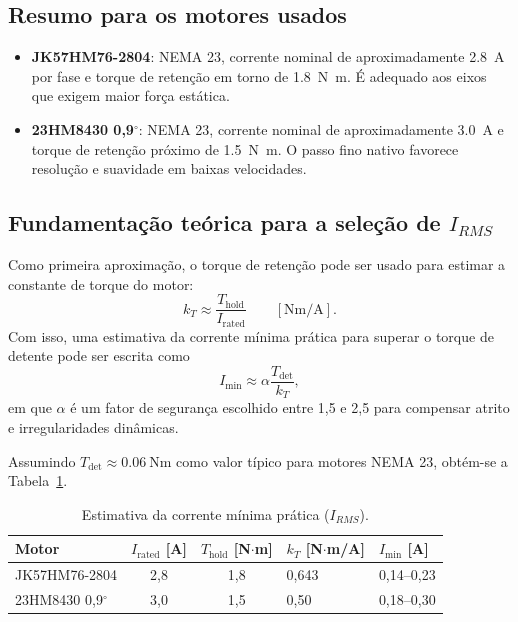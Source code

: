 \subsection{Resumo para os motores usados}

\begin{itemize}
\item \textbf{JK57HM76-2804}: NEMA 23, corrente nominal de
  aproximadamente \SI{2.8}{\ampere} por fase e torque de reten\c{c}\~ao em
  torno de \SI{1.8}{\newton\meter}. \'E adequado aos eixos que exigem
  maior for\c{c}a est\'atica.
\item \textbf{23HM8430 0,9$^\circ$}: NEMA 23, corrente nominal de
  aproximadamente \SI{3.0}{\ampere} e torque de reten\c{c}\~ao pr\'oximo de
  \SI{1.5}{\newton\meter}. O passo fino nativo favorece resolu\c{c}\~ao e
  suavidade em baixas velocidades.
\end{itemize}

\subsection{Fundamenta\c{c}\~ao te\'orica para a sele\c{c}\~ao de $I_{RMS}$}

Como primeira aproxima\c{c}\~ao, o torque de reten\c{c}\~ao pode ser usado
para estimar a constante de torque do motor:
\begin{equation}
    k_T \approx \frac{T_{\text{hold}}}{I_{\text{rated}}}
    \qquad [\si{\newton\meter\per\ampere}].
\end{equation}
Com isso, uma estimativa da corrente m\'inima pr\'atica para superar o
torque de detente pode ser escrita como
\begin{equation}
    I_{\min} \approx \alpha \frac{T_{\text{det}}}{k_T},
\end{equation}
em que $\alpha$ \'e um fator de seguran\c{c}a escolhido entre 1,5 e 2,5
para compensar atrito e irregularidades din\^amicas.

Assumindo $T_{\text{det}} \approx \SI{0.06}{\newton\meter}$ como valor
t\'ipico para motores NEMA 23, obt\'em-se a Tabela~\ref{tab:irms-estimado}.

\begin{table}[H]
    \centering
    \caption{Estimativa da corrente m\'inima pr\'atica ($I_{RMS}$).}
    \label{tab:irms-estimado}
    \setlength{\tabcolsep}{4pt}\footnotesize
    \begin{tabularx}{\textwidth}{lccXX}
        \toprule
        Motor & $I_{\text{rated}}$ [A] & $T_{\text{hold}}$ [N$\cdot$m] & $k_T$ [N$\cdot$m/A] & $I_{\min}$ [A] \\
        \midrule
        JK57HM76-2804 & 2,8 & 1,8 & 0,643 & 0,14--0,23 \\
        23HM8430 0,9$^\circ$ & 3,0 & 1,5 & 0,50 & 0,18--0,30 \\
        \bottomrule
    \end{tabularx}
\end{table}

